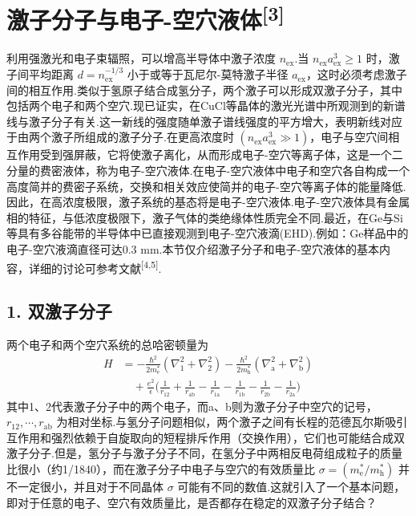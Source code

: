 \section{\texorpdfstring{激子分子与电子-空穴液体\textsuperscript{[3]}}{激子分子与电子-空穴液体[3]}}

利用强激光和电子束辐照，可以增高半导体中激子浓度 $n_{\mathrm{ex}}$.当 $n_{\mathrm{ex}}a_{\mathrm{ex}}^{3}\geqslant1$ 时，激子间平均距离 $d=n_{\mathrm{ex}}^{-1/3}$ 小于或等于瓦尼尔-莫特激子半径 $a_{\mathrm{ex}}$，这时必须考虑激子间的相互作用.类似于氢原子结合成氢分子，两个激子可以形成双激子分子，其中包括两个电子和两个空穴.现已证实，在CuCl等晶体的激光光谱中所观测到的新谱线与激子分子有关.这一新线的强度随单激子谱线强度的平方增大，表明新线对应于由两个激子所组成的激子分子.在更高浓度时 $\left(n_{\mathrm{ex}}a_{\mathrm{ex}}^{3}\gg1\right)$，电子与空穴间相互作用受到强屏蔽，它将使激子离化，从而形成电子-空穴等离子体，这是一个二分量的费密液体，称为电子-空穴液体.在电子-空穴液体中电子和空穴各自构成一个高度简并的费密子系统，交换和相关效应使简并的电子-空穴等离子体的能量降低.因此，在高浓度极限，激子系统的基态将是电子-空穴液体.电子-空穴液体具有金属相的特征，与低浓度极限下，激子气体的类绝缘体性质完全不同.最近，在Ge与Si等具有多谷能带的半导体中已直接观测到电子-空穴液滴(EHD).例如：Ge样品中的电子-空穴液滴直径可达0.3 mm.本节仅介绍激子分子和电子-空穴液体的基本内容，详细的讨论可参考文献\textsuperscript{[4,5]}.

\subsection*{1. 双激子分子}

两个电子和两个空穴系统的总哈密顿量为
\begin{equation}
\begin{aligned}
  H&=-\frac{\hbar^{2}}{2m_{\mathrm{e}}^{*}}
  \left(\nabla_{1}^{2}+\nabla_{2}^{2}\right)
  -\frac{\hbar^{2}}{2m_{\mathrm{h}}^{*}}
  \left(\nabla_{\mathrm{a}}^{2}+\nabla_{\mathrm{b}}^{2}\right)\\
  &\quad+\frac{e^{2}}{\epsilon}\biggl(\frac{1}{r_{12}}+\frac{1}{r_{\mathrm{ab}}}
  -\frac{1}{r_{1\mathrm{a}}}-\frac{1}{r_{1\mathrm{b}}}
  -\frac{1}{r_{2\mathrm{b}}}-\frac{1}{r_{2\mathrm{a}}}\biggr)
\end{aligned}
\end{equation}
其中1、2代表激子分子中的两个电子，而a、b则为激子分子中空穴的记号，$r_{12},\cdots,r_{\mathrm{ab}}$ 为相对坐标.与氢分子问题相似，两个激子之间有长程的范德瓦尔斯吸引互作用和强烈依赖于自旋取向的短程排斥作用（交换作用），它们也可能结合成双激子分子.但是，氢分子与激子分子不同，在氢分子中两相反电荷组成粒子的质量比很小（约1/1840），而在激子分子中电子与空穴的有效质量比 $\sigma=(m_{\mathrm{e}}^{*}/m_{\mathrm{h}}^{*})$ 并不一定很小，并且对于不同晶体 $\sigma$ 可能有不同的数值.这就引入了一个基本问题，即对于任意的电子、空穴有效质量比，是否都存在稳定的双激子分子结合？

